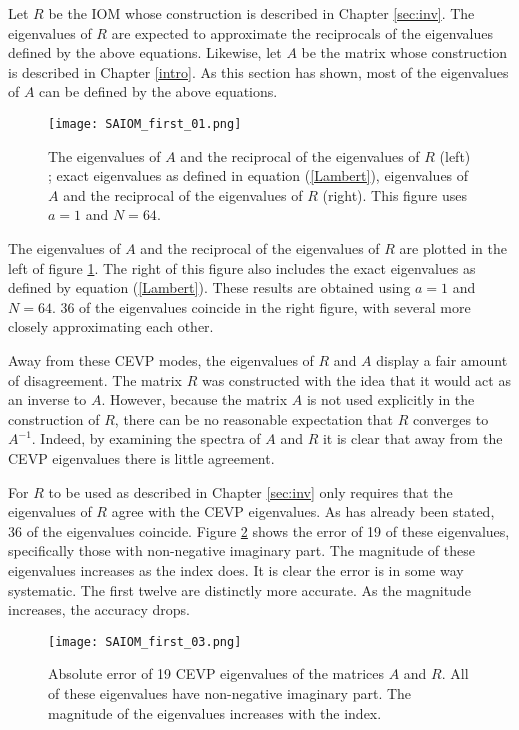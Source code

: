 \documentclass{sfuthesis}
\begin{document}
Let $R$ be the IOM whose construction is described in Chapter \ref{sec:inv}.
The eigenvalues of $R$ are expected to approximate the reciprocals of the eigenvalues defined by the above equations.
Likewise, let $A$ be the matrix whose construction is described in Chapter \ref{intro}.
As this section has shown, most of the eigenvalues of $A$ can be defined by the above equations.

\begin{figure}
\texttt{[image: SAIOM\_first\_01.png]}
\caption{The eigenvalues of $A$ and the reciprocal of the eigenvalues of $R$ (left) ; exact eigenvalues as defined in equation (\ref{Lambert}), eigenvalues of $A$ and the reciprocal of the eigenvalues of $R$ (right). This figure uses $a = 1$ and $N = 64$.}
\label{fig:SAIOM 1}
\end{figure}

The eigenvalues of $A$ and the reciprocal of the eigenvalues of $R$ are plotted in the left of figure \ref{fig:SAIOM 1}.
The right of this figure also includes the exact eigenvalues as defined by equation (\ref{Lambert}).
These results are obtained using $a = 1$ and $N = 64$.
36 of the eigenvalues coincide in the right figure, with several more closely approximating each other.

Away from these CEVP modes, the eigenvalues of $R$ and $A$ display a fair amount of disagreement.
The matrix $R$ was constructed with the idea that it would act as an inverse to $A$.
However, because the matrix $A$ is not used explicitly in the construction of $R$, there can be no reasonable expectation that $R$ converges to $A^{-1}$.
Indeed, by examining the spectra of $A$ and $R$ it is clear that away from the CEVP eigenvalues there is little agreement.

For $R$ to be used as described in Chapter \ref{sec:inv} only requires that the eigenvalues of $R$ agree with the CEVP eigenvalues. %
As has already been stated, 36 of the eigenvalues coincide.
Figure \ref{fig:SAIOM 3} shows the error of 19 of these eigenvalues, specifically those with non-negative imaginary part.
The magnitude of these eigenvalues increases as the index does.
It is clear the error is in some way systematic.
The first twelve are distinctly more accurate.
As the magnitude increases, the accuracy drops.

\begin{figure}
\texttt{[image: SAIOM\_first\_03.png]}
\caption{Absolute error of 19 CEVP eigenvalues of the matrices $A$ and $R$. All of these eigenvalues have non-negative imaginary part. The magnitude of the eigenvalues increases with the index.}
\label{fig:SAIOM 3}
\end{figure}
\end{document}
